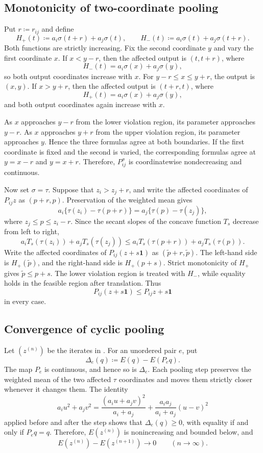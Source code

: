 \documentclass[11pt]{amsart}
\theoremstyle{plain}
\theoremstyle{definition}
\theoremstyle{remark}
\begin{document}
\subsection{Monotonicity of two-coordinate pooling}
\label{subsec:app-pairwise-pooling}

Put $r\coloneqq r_{ij}$ and define
\[
H_+(t)\coloneqq a_i\sigma(t+r)+a_j\sigma(t),\qquad H_-(t)\coloneqq a_i\sigma(t)+a_j\sigma(t+r).
\]
Both functions are strictly increasing. Fix the second coordinate $y$ and vary the first coordinate $x$. If $x<y-r$, then the affected output is $(t,t+r)$, where
\[
H_-(t)=a_i\sigma(x)+a_j\sigma(y),
\]
so both output coordinates increase with $x$. For $y-r\leq x\leq y+r$, the output is $(x,y)$. If $x>y+r$, then the affected output is $(t+r,t)$, where
\[
H_+(t)=a_i\sigma(x)+a_j\sigma(y),
\]
and both output coordinates again increase with $x$.

As $x$ approaches $y-r$ from the lower violation region, its parameter approaches $y-r$. As $x$ approaches $y+r$ from the upper violation region, its parameter approaches $y$. Hence the three formulas agree at both boundaries. If the first coordinate is fixed and the second is varied, the corresponding formulas agree at $y=x-r$ and $y=x+r$. Therefore, $P_{ij}^\sigma$ is coordinatewise nondecreasing and continuous.

Now set $\sigma=\tau$. Suppose that $z_i>z_j+r$, and write the affected coordinates of $P_{ij}z$ as $(p+r,p)$. Preservation of the weighted mean gives
\[
a_i\{\tau(z_i)-\tau(p+r)\}=a_j\{\tau(p)-\tau(z_j)\},
\]
where $z_j\leq p\leq z_i-r$. Since the secant slopes of the concave function $T_s$ decrease from left to right,
\[
a_iT_s(\tau(z_i))+a_jT_s(\tau(z_j))\leq a_iT_s(\tau(p+r))+a_jT_s(\tau(p)).
\]
Write the affected coordinates of $P_{ij}(z+s\boldsymbol1)$ as $(\widetilde p+r,\widetilde p)$. The left-hand side is $H_+(\widetilde p)$, and the right-hand side is $H_+(p+s)$. Strict monotonicity of $H_+$ gives $\widetilde p\leq p+s$. The lower violation region is treated with $H_-$, while equality holds in the feasible region after translation. Thus
\[
P_{ij}(z+s\boldsymbol1)\leq P_{ij}z+s\boldsymbol1
\]
in every case.

\subsection{Convergence of cyclic pooling}
\label{subsec:app-pooling-convergence}

Let $(z^{(n)})$ be the iterates in . For an unordered pair $e$, put
\[
\Delta_e(q)\coloneqq E(q)-E(P_eq).
\]
The map $P_e$ is continuous, and hence so is $\Delta_e$. Each pooling step preserves the weighted mean of the two affected $\tau$ coordinates and moves them strictly closer whenever it changes them. The identity
\[
a_i u^2+a_jv^2=\frac{(a_i u+a_jv)^2}{a_i+a_j}+\frac{a_ia_j}{a_i+a_j}(u-v)^2
\]
applied before and after the step shows that $\Delta_e(q)\geq0$, with equality if and only if $P_eq=q$. Therefore, $E(z^{(n)})$ is nonincreasing and bounded below, and
\[
E(z^{(n)})-E(z^{(n+1)})\longrightarrow0\qquad(n\to\infty).
\]
\end{document}
